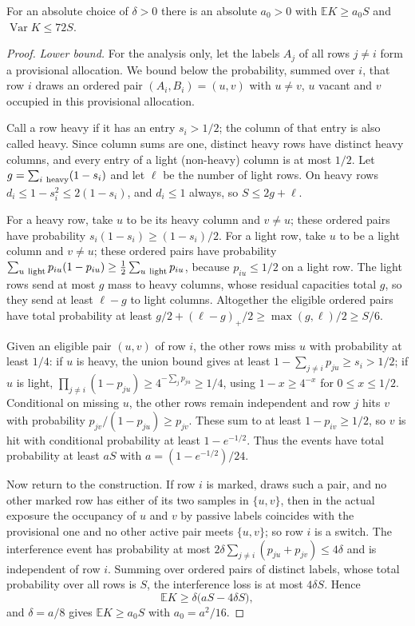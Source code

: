 \documentclass[11pt,a4paper]{article}
\theoremstyle{definition}\newtheorem{remark}[theorem]{Remark}\newtheorem{conjecture}{Conjecture}
\newcommand{\E}{\mathbb E}\newcommand{\Prb}{\mathbb P}\newcommand{\Var}{\operatorname{Var}}
\begin{document}
\begin{lemma}\label{lem:switch}
For an absolute choice of $\delta>0$ there is an absolute $a_0>0$ with
$\E K\ge a_0 S$ and $\Var K\le72S$.
\end{lemma}
\begin{proof}
\emph{Lower bound.} For the analysis only, let the labels $A_j$ of all rows $j\ne i$ form a provisional allocation. We bound below the probability, summed over $i$, that row $i$ draws an ordered pair $(A_i,B_i)=(u,v)$ with $u\ne v$, $u$ vacant and $v$ occupied in this provisional allocation.

Call a row heavy if it has an entry $s_i>1/2$; the column of that entry is also called heavy. Since column sums are one, distinct heavy rows have distinct heavy columns, and every entry of a light (non-heavy) column is at most $1/2$. Let $g=\sum_{i\ \rm heavy}(1-s_i)$ and let $\ell$ be the number of light rows. On heavy rows $d_i\le1-s_i^2\le2(1-s_i)$, and $d_i\le1$ always, so $S\le2g+\ell$.

For a heavy row, take $u$ to be its heavy column and $v\ne u$; these ordered pairs have probability $s_i(1-s_i)\ge(1-s_i)/2$. For a light row, take $u$ to be a light column and $v\ne u$; these ordered pairs have probability $\sum_{u\ \rm light}p_{iu}(1-p_{iu})\ge\tfrac12\sum_{u\ \rm light}p_{iu}$, because $p_{iu}\le1/2$ on a light row. The light rows send at most $g$ mass to heavy columns, whose residual capacities total $g$, so they send at least $\ell-g$ to light columns. Altogether the eligible ordered pairs have total probability at least $g/2+(\ell-g)_+/2\ge\max(g,\ell)/2\ge S/6$.

Given an eligible pair $(u,v)$ of row $i$, the other rows miss $u$ with probability at least $1/4$: if $u$ is heavy, the union bound gives at least $1-\sum_{j\ne i}p_{ju}\ge s_i>1/2$; if $u$ is light, $\prod_{j\ne i}(1-p_{ju})\ge4^{-\sum_jp_{ju}}\ge1/4$, using $1-x\ge4^{-x}$ for $0\le x\le1/2$. Conditional on missing $u$, the other rows remain independent and row $j$ hits $v$ with probability $p_{jv}/(1-p_{ju})\ge p_{jv}$. These sum to at least $1-p_{iv}\ge1/2$, so $v$ is hit with conditional probability at least $1-e^{-1/2}$. Thus the events have total probability at least $aS$ with $a=(1-e^{-1/2})/24$.

Now return to the construction. If row $i$ is marked, draws such a pair, and no other marked row has either of its two samples in $\{u,v\}$, then in the actual exposure the occupancy of $u$ and $v$ by passive labels coincides with the provisional one and no other active pair meets $\{u,v\}$; so row $i$ is a switch. The interference event has probability at most $2\delta\sum_{j\ne i}(p_{ju}+p_{jv})\le4\delta$ and is independent of row $i$. Summing over ordered pairs of distinct labels, whose total probability over all rows is $S$, the interference loss is at most $4\delta S$. Hence
\[
\E K\ge\delta\big(aS-4\delta S\big),
\]
and $\delta=a/8$ gives $\E K\ge a_0S$ with $a_0=a^2/16$.


\end{proof}
\end{document}
